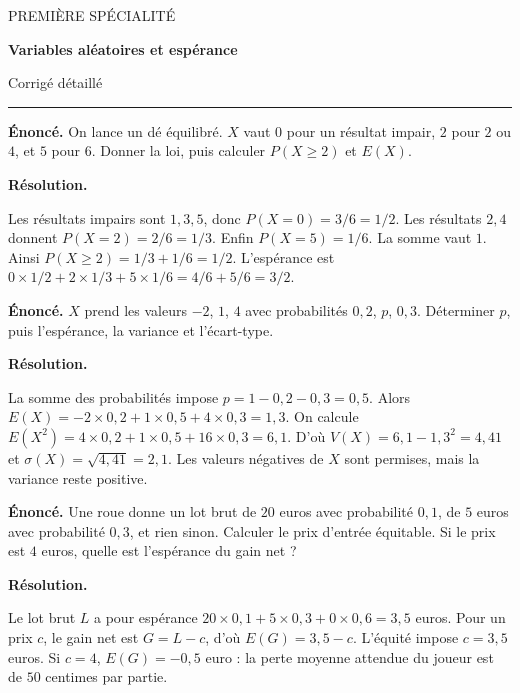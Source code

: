\documentclass[11pt,a4paper]{article}
\begin{document}
{\small\color{Blue}PREMIÈRE SPÉCIALITÉ}\par{\LARGE\bfseries Variables aléatoires et espérance}\par{\large Corrigé détaillé}\par\vspace{0.2cm}\hrule\vspace{0.4cm}
\par\noindent\begin{minipage}{\linewidth}
{\small\color{Muted}\textbf{Énoncé.} On lance un dé équilibré. $X$ vaut $0$ pour un résultat impair, $2$ pour $2$ ou $4$, et $5$ pour $6$. Donner la loi, puis calculer $P(X\ge2)$ et $E(X)$.}
\par\medskip
\textbf{Résolution.}\par
Les résultats impairs sont $1,3,5$, donc $P(X=0)=3/6=1/2$. Les résultats $2,4$ donnent $P(X=2)=2/6=1/3$. Enfin $P(X=5)=1/6$. La somme vaut $1$. Ainsi $P(X\ge2)=1/3+1/6=1/2$. L’espérance est $0\times1/2+2\times1/3+5\times1/6=4/6+5/6=3/2$.
\end{minipage}\par
\par\noindent\begin{minipage}{\linewidth}
{\small\color{Muted}\textbf{Énoncé.} $X$ prend les valeurs $-2$, $1$, $4$ avec probabilités $0,2$, $p$, $0,3$. Déterminer $p$, puis l’espérance, la variance et l’écart-type.}
\par\medskip
\textbf{Résolution.}\par
La somme des probabilités impose $p=1-0,2-0,3=0,5$. Alors $E(X)=-2\times0,2+1\times0,5+4\times0,3=1,3$. On calcule $E(X^2)=4\times0,2+1\times0,5+16\times0,3=6,1$. D’où $V(X)=6,1-1,3^2=4,41$ et $\sigma(X)=\sqrt{4,41}=2,1$. Les valeurs négatives de $X$ sont permises, mais la variance reste positive.
\end{minipage}\par
\par\noindent\begin{minipage}{\linewidth}
{\small\color{Muted}\textbf{Énoncé.} Une roue donne un lot brut de $20$ euros avec probabilité $0,1$, de $5$ euros avec probabilité $0,3$, et rien sinon. Calculer le prix d’entrée équitable. Si le prix est $4$ euros, quelle est l’espérance du gain net ?}
\par\medskip
\textbf{Résolution.}\par
Le lot brut $L$ a pour espérance $20\times0,1+5\times0,3+0\times0,6=3,5$ euros. Pour un prix $c$, le gain net est $G=L-c$, d’où $E(G)=3,5-c$. L’équité impose $c=3,5$ euros. Si $c=4$, $E(G)=-0,5$ euro : la perte moyenne attendue du joueur est de $50$ centimes par partie.
\end{minipage}\par
\end{document}
